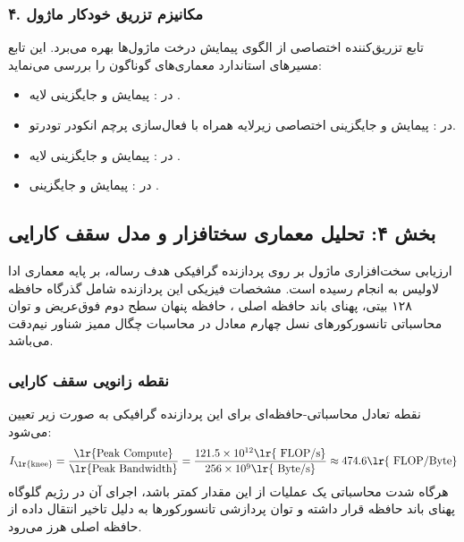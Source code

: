 \subsubsection*{۴. مکانیزم تزریق خودکار ماژول }
تابع تزریق‌کننده اختصاصی  از الگوی پیمایش درخت ماژول‌ها بهره می‌برد. این تابع مسیرهای استاندارد معماری‌های گوناگون را بررسی می‌نماید:
\begin{itemize}
    \item در : پیمایش  و جایگزینی لایه .
    \item در : پیمایش  و جایگزینی اختصاصی زیرلایه  همراه با فعال‌سازی پرچم انکودر تودرتو.
    \item در : پیمایش  و جایگزینی لایه .
    \item در : پیمایش  و جایگزینی .
\end{itemize}

\subsection*{بخش ۴: تحلیل معماری سختافزار و مدل سقف کارایی }
ارزیابی سخت‌افزاری ماژول  بر روی پردازنده گرافیکی هدف رساله،  بر پایه معماری ادا لاولیس  به انجام رسیده است. مشخصات فیزیکی این پردازنده شامل گذرگاه حافظه ۱۲۸ بیتی، پهنای باند حافظه اصلی ، حافظه پنهان سطح دوم فوق‌عریض  و توان محاسباتی تانسورکورهای نسل چهارم معادل  در محاسبات چگال ممیز شناور نیم‌دقت  می‌باشد.

\subsubsection*{نقطه زانویی سقف کارایی }
نقطه تعادل محاسباتی-حافظه‌ای  برای این پردازنده گرافیکی به صورت زیر تعیین می‌شود:
\begin{equation}
I_{\text{\lr{knee}}} = \frac{\text{\lr{Peak Compute}}}{\text{\lr{Peak Bandwidth}}} = \frac{121.5 \times 10^{12} \text{\lr{ FLOP/s}}}{256 \times 10^9 \text{\lr{ Byte/s}}} \approx 474.6 \text{\lr{ FLOP/Byte}}
\end{equation}
هرگاه شدت محاسباتی  یک عملیات از این مقدار کمتر باشد، اجرای آن در رژیم گلوگاه پهنای باند حافظه  قرار داشته و توان پردازشی تانسورکورها به دلیل تاخیر انتقال داده از حافظه اصلی  هرز می‌رود.


